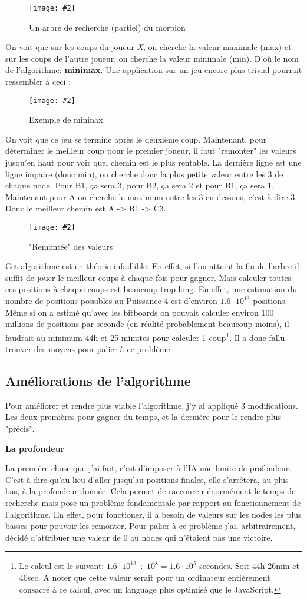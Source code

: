 \documentclass[a4paper]{article}
\newcommand{\img}[3][]{
    \begin{figure}[H]
        \centering
        \texttt{[image: \#2]}
        \caption{#1}    
    \end{figure}
}
\newcommand{\ptitle}[1]{\vspace{10pt}
{\large \noindent \textbf{#1}}}
\begin{document}
    \img[Un arbre de recherche (partiel) du morpion]{Images/MinimaxShema.png}{0.8}
    
    On voit que sur les coups du joueur \textit{X}, on cherche la valeur maximale (max) et sur les coups de l'autre joueur, on cherche la valeur minimale (min). D'où le nom de l'algorithme: \textbf{minimax}. Une application sur un jeu encore plus trivial pourrait ressembler à ceci :
    \img[Exemple de mininax]{Images/MinimaxShema2.png}{0.75}
    On voit que ce jeu se termine après le deuxième coup. Maintenant, pour déterminer le meilleur coup pour le premier joueur, il faut "remonter" les valeurs jusqu'en haut pour voir quel chemin est le plus rentable. La dernière ligne est une ligne impaire (donc min), on cherche donc la plus petite valeur entre les 3 de chaque node. Pour B1, ça sera 3, pour B2, ça sera 2 et pour B1, ça sera 1. Maintenant pour A on cherche le maximum entre les 3 en dessous, c'est-à-dire 3. Donc le meilleur chemin est A -> B1 -> C3.
    \img["Remontée" des valeurs]{Images/MinimaxShema3.png}{0.6}

    Cet algorithme est en théorie infaillible. En effet, si l'on atteint la fin de l'arbre il suffit de jouer le meilleur coups à chaque fois pour gagner. Mais calculer toutes ces positions à chaque coups est beaucoup trop long. En effet, une estimation du nombre de positions possibles au Puissance 4 est d'environ \textbf{$1.6\cdot10^{13}$} positions. Même si on a estimé qu'avec les bitboards on pouvait calculer environ 100 millions de positions par seconde (en réalité probablement beaucoup moins), il faudrait au minimum 44h et 25 minutes pour calculer 1 coup\footnote{Le calcul est le suivant: $1.6\cdot10^{13}\div10^{8} = 1.6\cdot10^{5}$ secondes. Soit 44h 26min et 40sec. A noter que cette valeur serait pour un ordinateur entièrement consacré à ce calcul, avec un language plus optimisé que le JavaScript.}. Il a donc fallu trouver des moyens pour palier à ce problème.

\subsection{Améliorations de l'algorithme}

    Pour améliorer et rendre plus viable l'algorithme, j'y ai appliqué 3 modifications. Les deux premières pour gagner du temps, et la dernière pour le rendre plus "précis".

    \ptitle{La profondeur}

    La première chose que j'ai fait, c'est d'imposer à l'IA une limite de profondeur. C'est à dire qu'au lieu d'aller jusqu'au positions finales, elle s'arrêtera, au plus bas, à la profondeur donnée. Cela permet de raccourcir énormément le temps de recherche mais pose un problème fondamentale par rapport au fonctionnement de l'algorithme. En effet, pour fonctioner, il a besoin de valeurs sur les nodes les plus basses pour pouvoir les remonter. Pour palier à ce problème j'ai, arbitrairement, décidé d'attribuer une valeur de 0 au nodes qui n'étaient pas une victoire.
\end{document}
